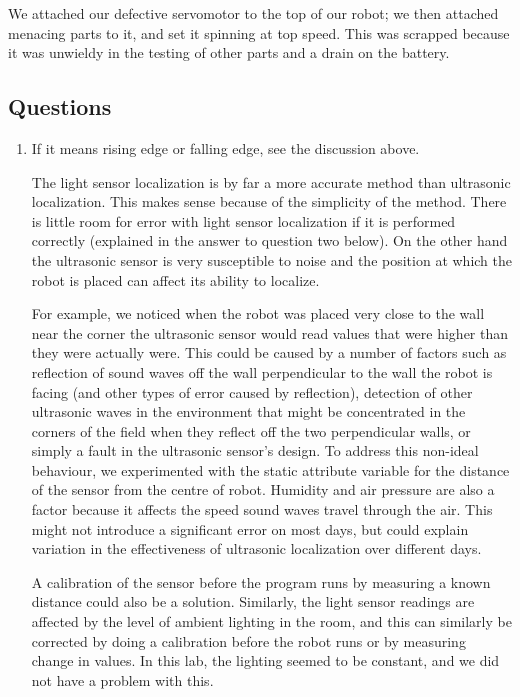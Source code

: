 \documentclass[twocolumn]{article}
\begin{document}
We attached our defective servomotor to the top of our robot; we then attached menacing parts to it, and set it spinning at top speed. This was scrapped because it was unwieldy in the testing of other parts and a drain on the battery.

\subsection{Questions}

\begin{enumerate}

\item
If it means rising edge or falling edge, see the discussion above.

The light sensor localization is by far a more accurate method than ultrasonic localization. This makes sense because of the simplicity of the method. There is little room for error with light sensor localization if it is performed correctly (explained in the answer to question two below). On the other hand the ultrasonic sensor is very susceptible to noise and the position at which the robot is placed can affect its ability to localize.

For example, we noticed when the robot was placed very close to the wall near the corner the ultrasonic sensor would read values that were higher than they were actually were. This could be caused by a number of factors such as reflection of sound waves off the wall perpendicular to the wall the robot is facing (and other types of error caused by reflection), detection of other ultrasonic waves in the environment that might be concentrated in the corners of the field when they reflect off the two perpendicular walls, or simply a fault in the ultrasonic sensor's design. To address this non-ideal behaviour, we experimented with the static attribute variable for the distance of the sensor from the centre of robot. Humidity and air pressure are also a factor because it affects the speed sound waves travel through the air. This might not introduce a significant error on most days, but could explain variation in the effectiveness of ultrasonic localization over different days.%

A calibration of the sensor before the program runs by measuring a known distance could also be a solution. Similarly, the light sensor readings are affected by the level of ambient lighting in the room, and this can similarly be corrected by doing a calibration before the robot runs or by measuring change in values. In this lab, the lighting seemed to be constant, and we did not have a problem with this.


\end{enumerate}
\end{document}
